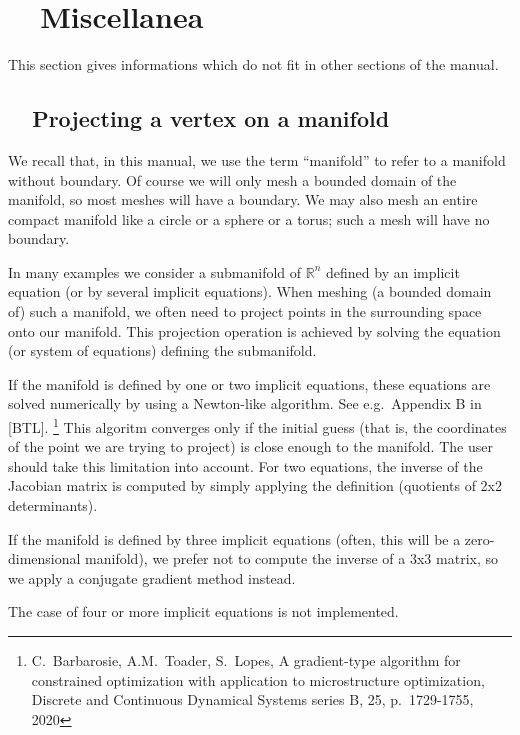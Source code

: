 
\chapter{~~Miscellanea}\label{\numb section 8}

This section gives informations which do not fit in other sections of the manual.


\section{~~Projecting a vertex on a manifold}\label{\numb section 8.\numb parag 1}

We recall that, in this manual, we use the term ``manifold'' to refer to a manifold without boundary.
Of course we will only mesh a bounded domain of the manifold, so most meshes will have a boundary.
We may also mesh an entire compact manifold like a circle or a sphere or a torus;
such a mesh will have no boundary.

In many examples we consider a submanifold of $ \mathbb{R}^n $ defined by an implicit equation
(or by several implicit equations).
When meshing (a bounded domain of) such a manifold, we often need to project points in
the surrounding space onto our manifold.
This projection operation is achieved by solving
the equation (or system of equations) defining the submanifold.

If the manifold is defined by one or two implicit equations,
these equations are solved numerically by using a Newton-like algorithm.
See e.g.\ Appendix B in [BTL].%
\footnote {{} C.~Barbarosie, A.M.~Toader, S.~Lopes, A gradient-type algorithm for constrained
optimization with application to microstructure optimization, Discrete and Continuous Dynamical
Systems series B, 25, p.\ 1729-1755, 2020}
This algoritm converges only if the initial guess (that is, the coordinates of the point we are
trying to project) is close enough to the manifold.
The user should take this limitation into account.
For two equations, the inverse of the Jacobian matrix is computed by simply applying the definition
(quotients of 2x2 determinants).

If the manifold is defined by three implicit equations (often, this will be a zero-dimensional manifold),
we prefer not to compute the inverse of a 3x3 matrix, so we apply a conjugate gradient method instead.

The case of four or more implicit equations is not implemented.

